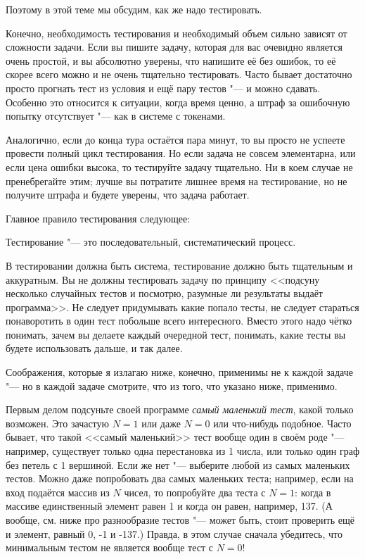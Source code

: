 Поэтому в этой теме мы обсудим, как же надо тестировать.

Конечно, необходимость тестирования и необходимый объем сильно зависят от сложности задачи. 
Если вы пишите задачу, которая для вас очевидно является очень простой, и вы абсолютно уверены, что напишите её без ошибок, 
то её скорее всего можно и не очень тщательно тестировать. 
Часто бывает достаточно просто прогнать тест из условия и ещё пару тестов "--- и можно сдавать. 
Особенно это относится к ситуации, когда время ценно, а штраф за ошибочную попытку отсутствует "--- как в системе с токенами.

Аналогично, если до конца тура остаётся пара минут, то вы просто не успеете провести полный цикл тестирования. 
Но если задача не совсем элементарна, или если цена ошибки высока, то тестируйте задачу тщательно. Ни в коем случае не пренебрегайте этим; 
лучше вы потратите лишнее время на тестирование, но не получите штрафа и будете уверены, что задача работает.

Главное правило тестирования следующее:

\begin{framed}
Тестирование "--- это последовательный, систематический процесс.
\end{framed}

В тестировании должна быть система, тестирование должно быть тщательным и аккуратным. 
Вы не должны тестировать задачу по принципу <<подсуну несколько случайных тестов и посмотрю, разумные ли результаты выдаёт программа>>. 
Не следует придумывать какие попало тесты, не следует стараться понаворотить в один тест побольше всего интересного. 
Вместо этого надо чётко понимать, зачем вы делаете каждый очередной тест, понимать, какие тесты вы будете использовать дальше, и так далее.

Соображения, которые я излагаю ниже, конечно, применимы не к каждой задаче "--- но в каждой задаче смотрите, что из того, что указано ниже, применимо.

Первым делом подсуньте своей программе \textit{самый маленький тест}, какой только возможен. Это зачастую $N=1$ или даже $N=0$ или что-нибудь подобное. Часто бывает, что такой <<самый маленький>> тест вообще один в своём роде "--- например, существует только одна перестановка из 1 числа, или только один граф без петель с 1 вершиной. Если же нет "--- выберите любой из самых маленьких тестов. Можно даже попробовать два самых маленьких теста; например, если на вход подаётся массив из $N$ чисел, то попробуйте два теста с $N=1$: когда в массиве единственный элемент равен 1 и когда он равен, например, 137. (А вообще, см. ниже про разнообразие тестов "--- может быть, стоит проверить ещё и элемент, равный 0, -1 и -137.) Правда, в этом случае сначала убедитесь, что минимальным тестом не является вообще тест с $N=0$!


